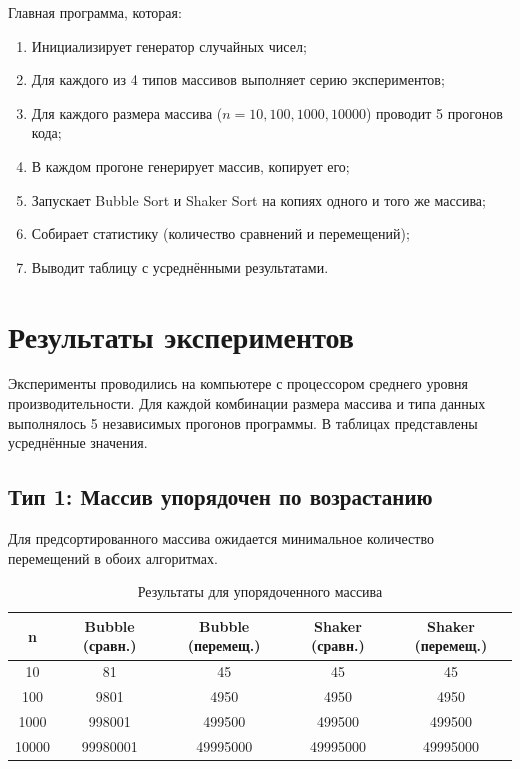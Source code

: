 \documentclass[a4paper,12pt,titlepage]{article}
\begin{document}
Главная программа, которая:
\begin{enumerate}
    \item Инициализирует генератор случайных чисел;
    \item Для каждого из 4 типов массивов выполняет серию экспериментов;
    \item Для каждого размера массива ($n = 10, 100, 1000, 10000$) проводит 5 прогонов кода;
    \item В каждом прогоне генерирует массив, копирует его;
    \item Запускает Bubble Sort и Shaker Sort на копиях одного и того же массива;
    \item Собирает статистику (количество сравнений и перемещений);
    \item Выводит таблицу с усреднёнными результатами.
\end{enumerate}

\newpage

\section{Результаты экспериментов}

Эксперименты проводились на компьютере с процессором среднего уровня производительности. Для каждой комбинации размера массива и типа данных выполнялось 5 независимых прогонов программы. В таблицах представлены усреднённые значения.

\subsection{Тип 1: Массив упорядочен по возрастанию}

Для предсортированного массива ожидается минимальное количество перемещений в обоих алгоритмах.

\begin{table}[h]
\centering
\begin{tabular}{|c|c|c|c|c|}
    \hline
    \textbf{n} & \textbf{Bubble (сравн.)} & \textbf{Bubble (перемещ.)} & \textbf{Shaker (сравн.)} & \textbf{Shaker (перемещ.)} \\
    \hline
    10 & 81 & 45 & 45 & 45 \\
    100 & 9801 & 4950 & 4950 & 4950 \\
    1000 & 998001 & 499500 & 499500 & 499500 \\
    10000 & 99980001 & 49995000 & 49995000 & 49995000 \\
    \hline
\end{tabular}
\caption{Результаты для упорядоченного массива}
\end{table}
\end{document}
